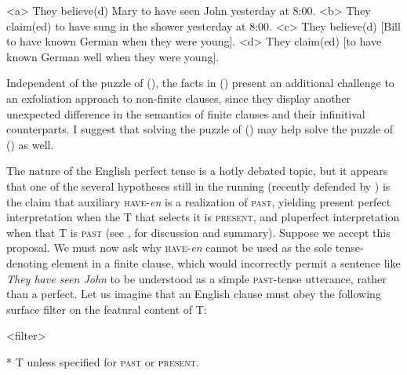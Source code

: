 \documentclass[output=paper]{langscibook}
\begin{document}
\a<a> They believe(d) Mary to have seen John yesterday at 8:00.
\a<b> They claim(ed) to have sung in the shower yesterday at 8:00.
\a<c> They believe(d) [Bill to have known German when they were young].
\a<d> They claim(ed) [to have known German well when they were young].
\xe

\noindent Independent of the puzzle of (), the facts in () present an additional challenge to an exfoliation approach to non-finite clauses, since they display another unexpected difference in the semantics of finite clauses and their infinitival counterparts. I suggest that solving the puzzle of () may help solve the puzzle of () as well.

The nature of the English perfect tense is a hotly debated topic, but it appears that one of the several hypotheses still in the running (recently defended by \citealt{KlechaPerfect}) is the claim that auxiliary \textsc{have-}\textit{en} is a realization of \textsc{past}, yielding present perfect interpretation when the T that selects it is \textsc{present}, and pluperfect interpretation when that T is \textsc{past (}see \citealt[Section 3 (esp. 3.1)]{GrOnn:2021aa}, for discussion and summary). Suppose we accept this proposal. We must now ask why \textsc{have-}\textit{en} cannot be used as the sole tense-denoting element in a finite clause, which would incorrectly permit a sentence like \textit{They have seen John} to be understood as a simple \textsc{past}-tense utterance, rather than a perfect. Let us imagine that an English clause must obey the following surface filter on the featural content of T:

\pex<filter>

* T unless specified for \textsc{past} or \textsc{present}.
\xe
\end{document}
